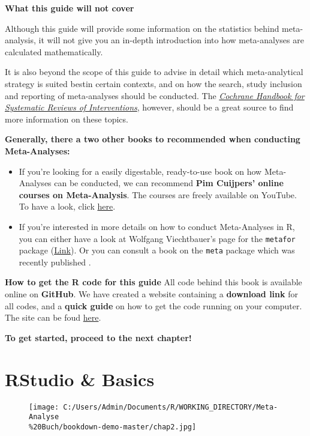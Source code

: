 \documentclass[]{book}
\providecommand{\tightlist}{%
  \setlength{\itemsep}{0pt}\setlength{\parskip}{0pt}}
\theoremstyle{definition}
\theoremstyle{definition}
\theoremstyle{definition}
\theoremstyle{remark}
\begin{document}
\textbf{What this guide will not cover}

Although this guide will provide some information on the statistics
behind meta-analysis, it will not give you an in-depth introduction into
how meta-analyses are calculated mathematically.

It is also beyond the scope of this guide to advise in detail which
meta-analytical strategy is suited bestin certain contexts, and on how
the search, study inclusion and reporting of meta-analyses should be
conducted. The \href{http://handbook-5-1.cochrane.org/}{\emph{Cochrane
Handbook for Systematic Reviews of Interventions}}, however, should be a
great source to find more information on these topics.

\textbf{Generally, there a two other books to recommended when
conducting Meta-Analyses:}

\begin{itemize}
\tightlist
\item
  If you're looking for a easily digestable, ready-to-use book on how
  Meta-Analyses can be conducted, we can recommend \textbf{Pim Cuijpers'
  online courses on Meta-Analysis}. The courses are freely available on
  YouTube. To have a look, click
  \href{https://www.youtube.com/watch?v=pP7_VBrG_TY\&list=PL-h5cI5Bkvt0J-O0kq_9J9_aksWFPgR7s}{here}.
\item
  If you're interested in more details on how to conduct Meta-Analyses
  in R, you can either have a look at Wolfgang Viechtbauer's page for
  the \texttt{metafor} package
  (\href{http://metafor-project.org}{Link}). Or you can consult a book
  on the \texttt{meta} package which was recently published
  \citep{schwarzer2015meta}.
\end{itemize}

\textbf{How to get the R code for this guide} All code behind this book
is available online on \textbf{GitHub}. We have created a website
containing a \textbf{download link} for all codes, and a \textbf{quick
guide} on how to get the code running on your computer. The site can be
foud
\href{https://mathiasharrer.github.io/Doing-Meta-Analysis-in-R/}{here}.

\textbf{To get started, proceed to the next chapter!}

\chapter{RStudio \& Basics}\label{rstudio-basics}

\begin{figure}
\centering
\texttt{[image: C:/Users/Admin/Documents/R/WORKING\_DIRECTORY/Meta-Analyse\\\%20Buch/bookdown-demo-master/chap2.jpg]}
\caption{}
\end{figure}
\end{document}

